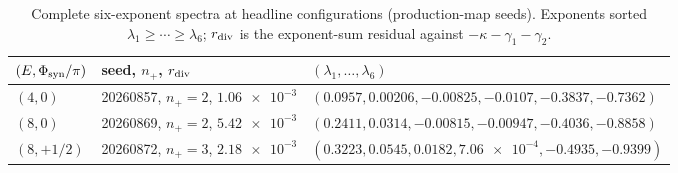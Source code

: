 \documentclass[preprint,numbers,a4paper]{elsarticle}
\begin{document}
\begin{table}[h]
  \centering
  \caption{Complete six-exponent spectra at headline configurations (production-map seeds). Exponents sorted $\lambda_1\ge\cdots\ge\lambda_6$; $r_{\rm div}$ is the exponent-sum residual against $-\kappa-\gamma_1-\gamma_2$.}
  \label{SI-tab:si-headline-spectra}
  \small
  \begin{tabular}{@{}lll@{}}
    \toprule
    $(E,\Phi_{\rm syn}/\pi)$ & seed, $n_{+}$, $r_{\rm div}$ & $(\lambda_1,\dots,\lambda_6)$ \\
    \midrule
    $(4,0)$ & \num{20260857}, $n_+=2$, $\num{1.06e-3}$ & $(\num{0.0957}, \num{0.00206}, \num{-0.00825}, \num{-0.0107}, \num{-0.3837}, \num{-0.7362})$ \\
    $(8,0)$ & \num{20260869}, $n_+=2$, $\num{5.42e-3}$ & $(\num{0.2411}, \num{0.0314}, \num{-0.00815}, \num{-0.00947}, \num{-0.4036}, \num{-0.8858})$ \\
    $(8,+1/2)$ & \num{20260872}, $n_+=3$, $\num{2.18e-3}$ & $(\num{0.3223}, \num{0.0545}, \num{0.0182}, \num{7.06e-4}, \num{-0.4935}, \num{-0.9399})$ \\
    \bottomrule
  \end{tabular}
\end{table}
\end{document}
